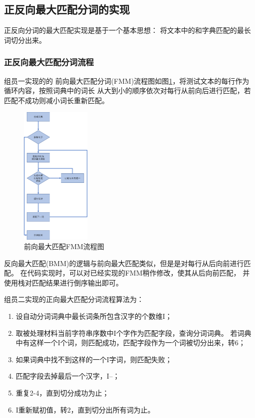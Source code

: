 \subsection{正反向最大匹配分词的实现}

正反向分词的最大匹配实现是基于一个基本思想：
将文本中的和字典匹配的最长词切分出来\citep{张磊2009中文分词算法解析}。

\subsubsection{正反向最大匹配分词流程}

组员一实现的的
前向最大匹配分词(FMM)流程图如图\ref{fmm}，将测试文本的每行作为循环内容，按照词典中的词长
从大到小的顺序依次对每行从前向后进行匹配，若匹配不成功则减小词长重新匹配。

\begin{figure}[H]
  \centering
  \includegraphics[width=0.3\textwidth]{figures/figure_01.png}
  \caption{前向最大匹配FMM流程图}
  \label{fmm}
\end{figure}

反向最大匹配(BMM)的逻辑与前向最大匹配类似，但是是对每行从后向前进行匹配。
在代码实现时，可以对已经实现的FMM稍作修改，使其从后向前匹配，
并使用栈对匹配结果进行倒序输出即可。

组员二实现的正向最大匹配分词流程算法为：
\begin{enumerate}
  \item 设自动分词词典中最长词条所包含汉字的个数维I；
  \item 取被处理材料当前字符串序数中I个字作为匹配字段，查询分词词典。
        若词典中有这样一个I个词，则匹配成功，匹配字段作为一个词被切分出来，转6；
  \item 如果词典中找不到这样的一个I字词，则匹配失败；
  \item 匹配字段去掉最后一个汉字，I--；
  \item 重复2-4，直到切分成功为止；
  \item I重新赋初值，转2，直到切分出所有词为止。
\end{enumerate}

